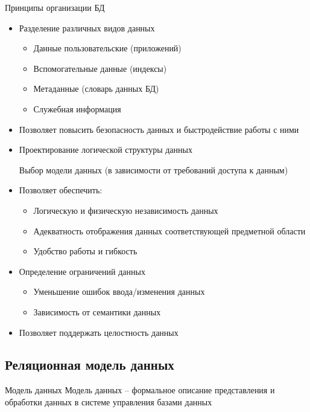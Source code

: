 \documentclass[12pt]{article}
\begin{document}
\begin{nota}{Принципы организации БД}
    \begin{itemize}
        \item Разделение различных видов данных
        \begin{itemize}
            \item Данные пользовательские (приложений)
            \item Вспомогательные данные (индексы)
            \item Метаданные (словарь данных БД)
            \item Служебная информация
        \end{itemize}
        \item Позволяет повысить безопасность данных и быстродействие работы с ними
        \item Проектирование логической структуры данных 
        
        Выбор модели данных (в зависимости от требований доступа к данным)

        \item Позволяет обеспечить: 
        \begin{itemize}
            \item Логическую и физическую независимость данных 
            \item Адекватность отображения данных соответствующей предметной области 
            \item Удобство работы и гибкость
        \end{itemize}
        \item Определение ограничений данных 
        \begin{itemize}
            \item Уменьшение ошибок ввода/изменения данных 
            \item Зависимость от семантики данных
        \end{itemize}
        \item Позволяет поддержать целостность данных 
    \end{itemize}
\end{nota}

\subsection{Реляционная модель данных}

\begin{defin}{Модель данных}
    Модель данных -- формальное описание представления и обработки данных в системе управления базами данных
\end{defin}
\end{document}
